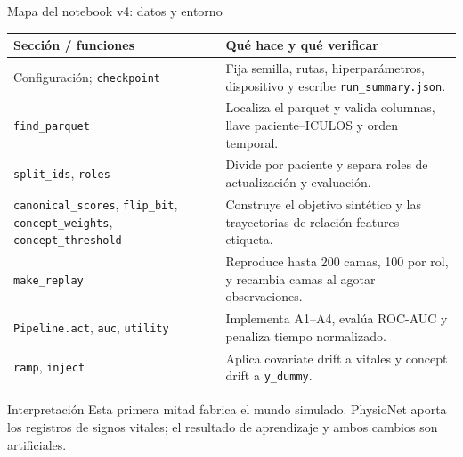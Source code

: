 \documentclass[aspectratio=169,10pt]{beamer}
\begin{document}
\begin{frame}{Mapa del notebook v4: datos y entorno}
\footnotesize
\begin{tabular}{p{}p{}}
\toprule
\textbf{Sección / funciones} & \textbf{Qué hace y qué verificar} \\
\midrule
Configuración; \texttt{checkpoint} & Fija semilla, rutas, hiperparámetros, dispositivo y escribe \texttt{run\_summary.json}. \\
\texttt{find\_parquet} & Localiza el parquet y valida columnas, llave paciente--ICULOS y orden temporal. \\
\texttt{split\_ids}, \texttt{roles} & Divide por paciente y separa roles de actualización y evaluación. \\
\texttt{canonical\_scores}, \texttt{flip\_bit}, \texttt{concept\_weights}, \texttt{concept\_threshold} & Construye el objetivo sintético y las trayectorias de relación features--etiqueta. \\
\texttt{make\_replay} & Reproduce hasta 200 camas, 100 por rol, y recambia camas al agotar observaciones. \\
\texttt{Pipeline.act}, \texttt{auc}, \texttt{utility} & Implementa A1--A4, evalúa ROC-AUC y penaliza tiempo normalizado. \\
\texttt{ramp}, \texttt{inject} & Aplica covariate drift a vitales y concept drift a \texttt{y\_dummy}. \\
\bottomrule
\end{tabular}
\vspace{0.2em}
\begin{block}{Interpretación}
Esta primera mitad fabrica el mundo simulado. PhysioNet aporta los registros
de signos vitales; el resultado de aprendizaje y ambos cambios son artificiales.
\end{block}
\end{frame}
\end{document}

